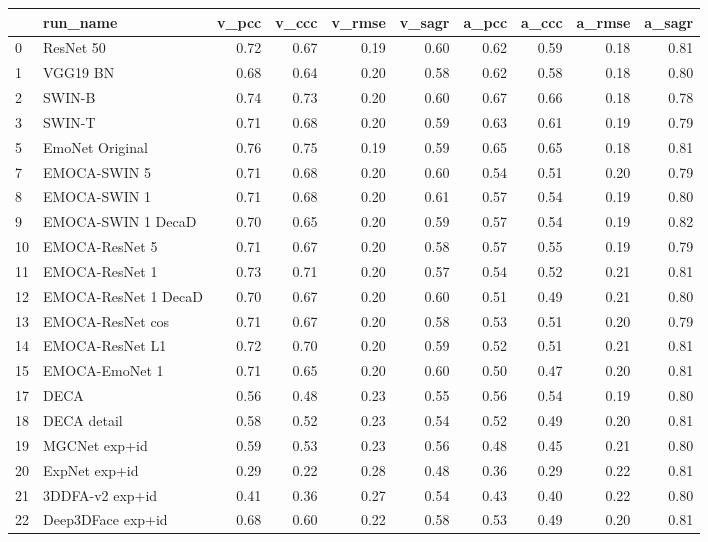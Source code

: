 \begin{tabular}{llrrrrrrrr}
\toprule
{} &              run\_name &  v\_pcc &  v\_ccc &  v\_rmse &  v\_sagr &  a\_pcc &  a\_ccc &  a\_rmse &  a\_sagr \\
\midrule
0  &             ResNet 50 &   0.72 &   0.67 &    0.19 &    0.60 &   0.62 &   0.59 &    0.18 &    0.81 \\
1  &              VGG19 BN &   0.68 &   0.64 &    0.20 &    0.58 &   0.62 &   0.58 &    0.18 &    0.80 \\
2  &                SWIN-B &   0.74 &   0.73 &    0.20 &    0.60 &   0.67 &   0.66 &    0.18 &    0.78 \\
3  &                SWIN-T &   0.71 &   0.68 &    0.20 &    0.59 &   0.63 &   0.61 &    0.19 &    0.79 \\
5  &       EmoNet Original &   0.76 &   0.75 &    0.19 &    0.59 &   0.65 &   0.65 &    0.18 &    0.81 \\
7  &          EMOCA-SWIN 5 &   0.71 &   0.68 &    0.20 &    0.60 &   0.54 &   0.51 &    0.20 &    0.79 \\
8  &          EMOCA-SWIN 1 &   0.71 &   0.68 &    0.20 &    0.61 &   0.57 &   0.54 &    0.19 &    0.80 \\
9  &    EMOCA-SWIN 1 DecaD &   0.70 &   0.65 &    0.20 &    0.59 &   0.57 &   0.54 &    0.19 &    0.82 \\
10 &        EMOCA-ResNet 5 &   0.71 &   0.67 &    0.20 &    0.58 &   0.57 &   0.55 &    0.19 &    0.79 \\
11 &        EMOCA-ResNet 1 &   0.73 &   0.71 &    0.20 &    0.57 &   0.54 &   0.52 &    0.21 &    0.81 \\
12 &  EMOCA-ResNet 1 DecaD &   0.70 &   0.67 &    0.20 &    0.60 &   0.51 &   0.49 &    0.21 &    0.80 \\
13 &      EMOCA-ResNet cos &   0.71 &   0.67 &    0.20 &    0.58 &   0.53 &   0.51 &    0.20 &    0.79 \\
14 &       EMOCA-ResNet L1 &   0.72 &   0.70 &    0.20 &    0.59 &   0.52 &   0.51 &    0.21 &    0.81 \\
15 &        EMOCA-EmoNet 1 &   0.71 &   0.65 &    0.20 &    0.60 &   0.50 &   0.47 &    0.20 &    0.81 \\
17 &                  DECA &   0.56 &   0.48 &    0.23 &    0.55 &   0.56 &   0.54 &    0.19 &    0.80 \\
18 &           DECA detail &   0.58 &   0.52 &    0.23 &    0.54 &   0.52 &   0.49 &    0.20 &    0.81 \\
19 &         MGCNet exp+id &   0.59 &   0.53 &    0.23 &    0.56 &   0.48 &   0.45 &    0.21 &    0.80 \\
20 &         ExpNet exp+id &   0.29 &   0.22 &    0.28 &    0.48 &   0.36 &   0.29 &    0.22 &    0.81 \\
21 &       3DDFA-v2 exp+id &   0.41 &   0.36 &    0.27 &    0.54 &   0.43 &   0.40 &    0.22 &    0.80 \\
22 &     Deep3DFace exp+id &   0.68 &   0.60 &    0.22 &    0.58 &   0.53 &   0.49 &    0.20 &    0.81 \\
\bottomrule
\end{tabular}
